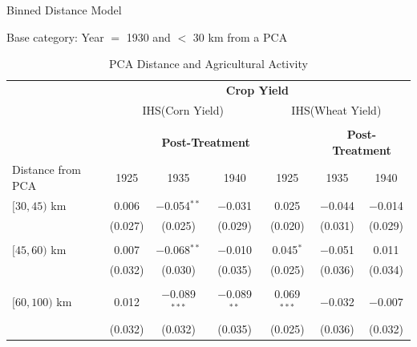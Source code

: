 \documentclass[12pt]{article}
\begin{document}
\begin{table}
    \centering

    \caption{PCA Distance and Agricultural Activity}
Binned Distance Model

\footnotesize   
\vspace{.5cm} 
Base category: Year $=$ 1930 and $<$ 30 km from a PCA
    \label{log-bin}
    \begin{threeparttable}[t]
    \footnotesize


\begin{tabular}{lcccccc}
\hline\hline
& \multicolumn{6}{c}{\textbf{Crop Yield}} \\
[.5em]
&\multicolumn{3}{c}{IHS(Corn Yield)}&\multicolumn{3}{c}{IHS(Wheat Yield)}\\
[.5em]
\cline{2-7}
& & & & & & \\ 
& \multicolumn{1}{c}{} & \multicolumn{2}{c}{\textbf{Post-Treatment}} & \multicolumn{1}{c}{} & \multicolumn{2}{c}{\textbf{Post-Treatment}} \\
Distance from PCA     & 1925 & 1935 & 1940 & 1925 & 1935 & 1940 \\ \hline
$[30, 45)$ km & 0.006    & $-$0.054$^{**}$ & $-$0.031        & 0.025        & $-$0.044    &  $-$0.014    \\
              & (0.027)  & (0.025)         & (0.029)         & (0.020)      & (0.031)     &  (0.029)     \\
              &          &                 &                 &              &             &              \\
$[45, 60)$ km & 0.007    & $-$0.068$^{**}$ & $-$0.010        & 0.045$^{*}$  & $-$0.051    &  0.011       \\
              & (0.032)  & (0.030)         & (0.035)         & (0.025)      & (0.036)     &  (0.034)     \\
              &          &                 &                 &              &             &              \\
$[60, 100)$ km& 0.012    & $-$0.089$^{***}$& $-$0.089$^{**}$ & 0.069$^{***}$& $-$0.032    &  $-$0.007    \\
              & (0.032)  & (0.032)         & (0.035)         & (0.025)      & (0.036)     &  (0.032)     \\

\end{tabular}
\end{threeparttable}
\end{table}
\end{document}

